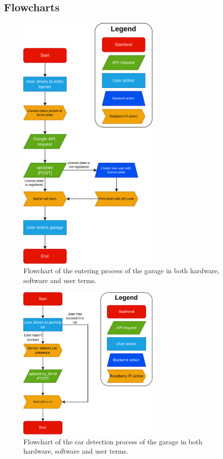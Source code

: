 \begin{appendices}
\section{Flowcharts}\label{app:flowcharts}

\begin{figure}[htp]
    \centering
    \includegraphics[width=7cm]{images/garage_enter.drawio.png}
    \caption{Flowchart of the entering process of the garage in both hardware, software and user terms.}
    \label{fig:garage-enter}
\end{figure}

\begin{figure}[htp]
    \centering
    \includegraphics[width=7cm]{images/car_detection.drawio.png}
    \caption{Flowchart of the car detection process of the garage in both hardware, software and user terms.}
    \label{fig:car-detection}
\end{figure}


\end{appendices}
